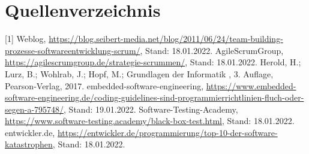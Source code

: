 \documentclass[12pt]{scrartcl}
\begin{document}
\newpage

\section{Quellenverzeichnis}

[1] Weblog, \url{https://blog.seibert-media.net/blog/2011/06/24/team-building-prozesse-softwareentwicklung-scrum/}, Stand: 18.01.2022.
\newline
[2] AgileScrumGroup, \url{https://agilescrumgroup.de/strategie-scrummen/}, Stand: 18.01.2022.
\newline
[3] Herold, H.; Lurz, B.; Wohlrab, J.; Hopf, M.; \glqq Grundlagen der Informatik \grqq , 3. Auflage, Pearson-Verlag, 2017.
\newline
[4] embedded-software-engineering, \url{https://www.embedded-software-engineering.de/coding-guidelines-sind-programmierrichtlinien-fluch-oder-segen-a-795748/}, Stand: 19.01.2022.
\newline
[5] Software-Testing-Academy, \url{https://www.software-testing.academy/black-box-test.html}, Stand: 18.01.2022.
\newline
[6] entwickler.de, \url{https://entwickler.de/programmierung/top-10-der-software-katastrophen}, Stand: 18.01.2022.

 
\end{document}
